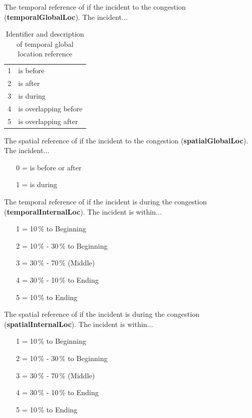 \documentclass[a4paper,headsepline,footsepline,fontsize=11pt,BCOR=12mm,DIV=12]{report}
\begin{document}
The temporal reference of if the incident to the congestion (\textbf{temporalGlobalLoc}). The incident...
\noindent
\begin{table}[h!]
	\centering
	\begin{tabular}{c|l}  
		1 & is before \\ 
 		2 & is after \\ 
 		3 & is during \\
 		4 & is overlapping before \\
 		5 & is overlapping after \\
	\end{tabular}
	\caption{Identifier and description of temporal global location reference}
\end{table}

The spatial reference of if the incident to the congestion (\textbf{spatialGlobalLoc}). The incident...
\begin{itemize}
	\setlength\itemsep{0em}
	\item[0] = is before or after
	\item[1] = is during
\end{itemize}

The temporal reference of if the incident is during the congestion (\textbf{temporalInternalLoc}). The incident is within...
\begin{itemize}
	\setlength\itemsep{0em}
	\item[1] = 10\,\% to Beginning
	\item[2] = 10\,\% - 30\,\% to Beginning
	\item[3] = 30\,\% - 70\,\% (Middle)
	\item[4] = 30\,\% - 10\,\% to Ending
	\item[5] = 10\,\% to Ending
\end{itemize}

The spatial reference of if the incident is during the congestion (\textbf{spatialInternalLoc}). The incident is within...
\begin{itemize}
	\setlength\itemsep{0em}
	\item[1] = 10\,\% to Beginning
	\item[2] = 10\,\% - 30\,\% to Beginning
	\item[3] = 30\,\% - 70\,\% (Middle)
	\item[4] = 30\,\% - 10\,\% to Ending
	\item[5] = 10\,\% to Ending
\end{itemize}
    
\end{document}
